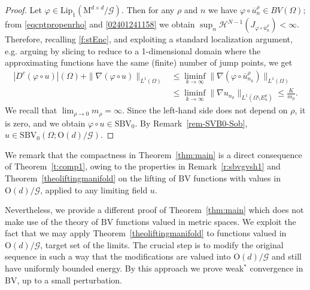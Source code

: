 \documentclass[a4paper,reqno]{amsart}
\newcommand{\BV}{\mathrm{BV}}
\newcommand{\SBV}{\mathrm{SBV}}
\newcommand\calH{\mathcal{H}}
\theoremstyle{remark}
\newcommand{\ol}{\overline}
\newcommand{\G}{\mathcal{G}}
\newcommand{\On}{\mathrm{O}(d)}
\newcommand{\Mno}{\mathrm{M}^{d\times d}}
\newcommand{\Lip}{\mathrm{Lip}}
\numberwithin{equation}{section}
\begin{document}
\begin{proof}
Let $\varphi\in \Lip_1(\Mno/\G)$. Then for any $\rho$ and $n$ we have
$\varphi\circ \ol u^\rho_n\in BV(\Omega)$;
from \eqref{eqcptpropenrho} and
\eqref{02401241158} we obtain
$\sup_n \calH^{N-1}(J_{\varphi\circ \ol u^\rho_n})<\infty$. Therefore, recalling \eqref{f:stEnc}, and exploiting a standard localization argument, e.g. arguing by slicing to reduce to a 1-dimensional domain where the approximating functions have the same (finite) number of jump points, we get
\begin{equation}\label{eqcptsbv0}
	\begin{split}
|D^c(\varphi\circ u)|(\Omega)
+ \|\nabla (\varphi\circ u)\|_{L^1(\Omega)} &
\le \liminf_{k\to\infty} \|\nabla (\varphi\circ \ol u_{n_k}^\rho)\|_{L^1(\Omega)} \\ &
\le \liminf_{k\to\infty} \|\nabla u_{n_k}\|_{L^1(\Omega\setminus E_n^\rho)}
\le \frac{K}{m_\rho}.
\end{split}
\end{equation}
We recall that $\lim_{\rho\to0} m_\rho=\infty$.
Since the left-hand side does not depend on $\rho$, it is zero, and we obtain $\varphi\circ u\in \SBV_0$. By
Remark~\ref{rem-SVB0-Sob}, $u\in \SBV_0(\Omega;\On/\G)$.
\end{proof}

We remark that the compactness in Theorem~\ref{thm:main} is a direct consequence of Theorem~\ref{t:comp1}, owing to the properties in Remark~\ref{r:sbvgvsh1} and
Theorem~\ref{theoliftingmanifold} on the lifting of $\BV$ functions with values in $\On/\G$, applied to any limiting field $u$.

Nevertheless, we provide a different proof of Theorem~\ref{thm:main} which does not make use of the theory of $\BV$ functions valued in metric spaces.
We exploit the fact that we may apply
Theorem~\ref{theoliftingmanifold} to functions valued in $\On/\G$, target set of the limits.
The crucial step is to modify the original sequence in such a way that the modifications are valued into $\On/\G$ and
still have uniformly bounded energy.
By this approach we prove weak$^*$ convergence in $\BV$, up to a small perturbation.
\end{document}
